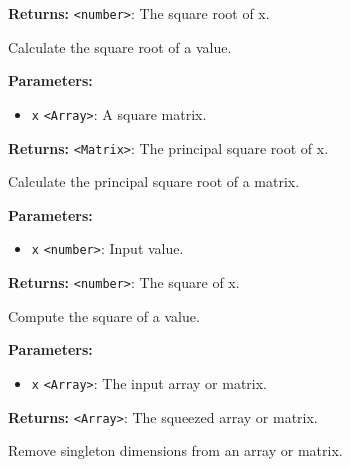 \documentclass[12pt,a4paper]{article}
\begin{document}
\noindent \textbf{Returns:} \texttt{<number>}: The square root of x.

\noindent Calculate the square root of a value.

\vspace{5mm}
\noindent {}


\noindent \textbf{Parameters:}
\begin{itemize}
  \item \texttt{x} \texttt{<Array>}: A square matrix.
\end{itemize}

\noindent \textbf{Returns:} \texttt{<Matrix>}: The principal square root of x.

\noindent Calculate the principal square root of a matrix.

\vspace{5mm}
\noindent {}


\noindent \textbf{Parameters:}
\begin{itemize}
  \item \texttt{x} \texttt{<number>}: Input value.
\end{itemize}

\noindent \textbf{Returns:} \texttt{<number>}: The square of x.

\noindent Compute the square of a value.

\vspace{5mm}
\noindent {}


\noindent \textbf{Parameters:}
\begin{itemize}
  \item \texttt{x} \texttt{<Array>}: The input array or matrix.
\end{itemize}

\noindent \textbf{Returns:} \texttt{<Array>}: The squeezed array or matrix.

\noindent Remove singleton dimensions from an array or matrix.

\vspace{5mm}
\noindent {}
\end{document}
